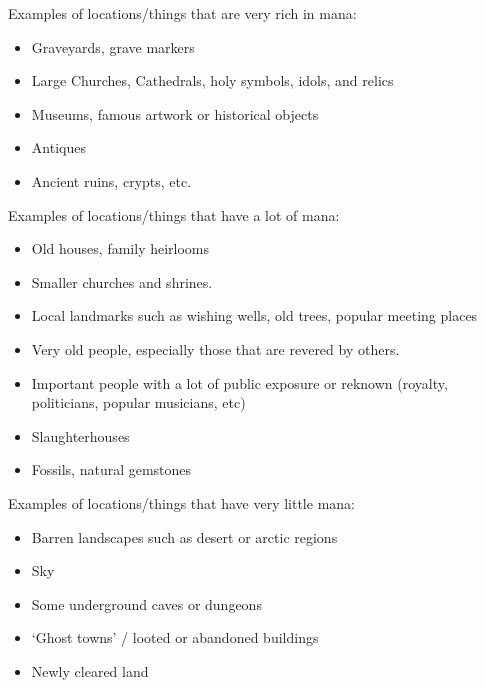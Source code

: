 \documentclass[twoside]{book}
\begin{document}
    {  
     Examples of locations/things that are very rich in
             mana: 
    }
  
\begin{itemize}
      
  \item   Graveyards, grave markers 
  \item   Large Churches, Cathedrals, holy symbols, idols,
               and relics 
  \item   Museums, famous artwork or historical objects
               
  \item   Antiques 
  \item   Ancient ruins, crypts, etc. 
\end{itemize}
  
    {  
     Examples of locations/things that have a lot of mana:
             
    }
  
\begin{itemize}
      
  \item   Old houses, family heirlooms 
  \item   Smaller churches and shrines. 
  \item   Local landmarks such as wishing wells, old trees,
               popular meeting places 
  \item   Very old people, especially those that are revered
               by others. 
  \item   Important people with a lot of public exposure or
               reknown (royalty, politicians, popular musicians, etc)
               
  \item   Slaughterhouses 
  \item   Fossils, natural gemstones 
\end{itemize}
  
    {  
     Examples of locations/things that have very little
             mana: 
    }
  
\begin{itemize}
      
  \item   Barren landscapes such as desert or arctic regions
               
  \item   Sky 
  \item   Some underground caves or dungeons 
  \item   `Ghost towns' / looted or abandoned
               buildings 
  \item   Newly cleared land 
\end{itemize}
  
\end{document}
